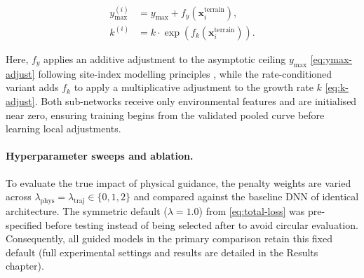 \documentclass[11pt,a4paper]{report}
\begin{document}
\begin{subequations}
\label{eq:env-adjustments}
\begin{align}
y_{\max}^{(i)} &= y_{\max} + f_{y}\!\left(\mathbf{x}^{\text{terrain}}_i\right), \label{eq:ymax-adjust} \\
k^{(i)} &= k \cdot \exp\!\left(f_{k}\!\left(\mathbf{x}^{\text{terrain}}_i\right)\right). \label{eq:k-adjust}
\end{align}
\end{subequations}

Here, $f_y$ applies an additive adjustment to the asymptotic ceiling $y_{\max}$ \eqref{eq:ymax-adjust} following site-index modelling principles \citep{socha2023Higher_C1_SS}, while the rate-conditioned variant adds $f_k$ to apply a multiplicative adjustment to the growth rate $k$ \eqref{eq:k-adjust}. Both sub-networks receive only environmental features and are initialised near zero, ensuring training begins from the validated pooled curve before learning local adjustments.

\paragraph*{Hyperparameter sweeps and ablation.}
\label{sec:rq1-ablation}
To evaluate the true impact of physical guidance, the penalty weights are varied across $\lambda_{\text{phys}} = \lambda_{\text{traj}} \in \{0, 1, 2\}$ and compared against the baseline DNN of identical architecture. The symmetric default ($\lambda = 1.0$) from \eqref{eq:total-loss} was pre-specified before testing instead of being selected after to avoid circular evaluation. Consequently, all guided models in the primary comparison retain this fixed default (full experimental settings and results are detailed in the Results chapter).
\end{document}
